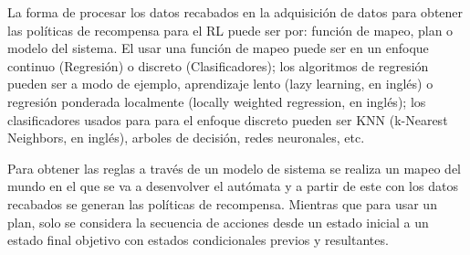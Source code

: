 La forma de procesar los datos recabados en la adquisici\'on de datos para 
 obtener las pol\'iticas de recompensa para el RL puede ser por: funci\'on 
 de mapeo, plan o modelo del sistema. El usar una funci\'on de mapeo 
 \cite{ARGALL2009469} puede ser en un enfoque continuo (Regresi\'on) o 
 discreto (Clasificadores); los algoritmos de regresi\'on pueden ser a modo 
 de ejemplo, aprendizaje lento (lazy learning, en ingl\'es) o regresi\'on 
 ponderada localmente (locally weighted regression, en ingl\'es); los 
 clasificadores usados para para el enfoque discreto pueden ser KNN 
 (k-Nearest Neighbors, en ingl\'es), arboles de decisi\'on, redes neuronales, 
 etc. 
 

Para obtener las reglas a trav\'es de un modelo de sistema \cite{ARGALL2009469}
 se realiza un mapeo del mundo en el que se va a desenvolver el aut\'omata 
 y a partir de este con los datos recabados se generan las pol\'iticas de 
 recompensa. Mientras que para usar un plan\cite{ARGALL2009469}, solo se 
 considera la secuencia de acciones desde un estado inicial a un estado final 
 objetivo con estados condicionales previos y resultantes. 
